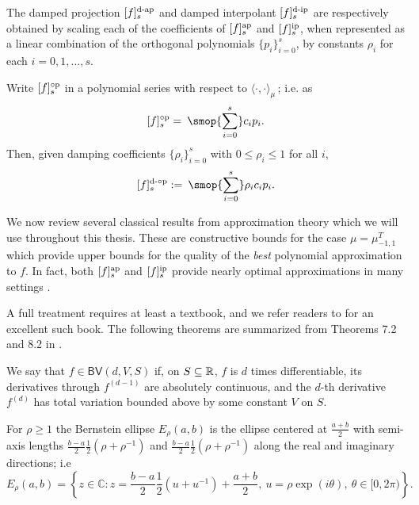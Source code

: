 The damped projection \( \ff[d-a]{f}{s} \) and damped interpolant \( \ff[d-i]{f}{s} \) are respectively obtained by scaling each of the coefficients of \( \ff[a]{f}{s} \) and \( \ff[i]{f}{s} \), when represented as a linear combination of the orthogonal polynomials \( \{ p_i \}_{i=0}^{s} \), by constants \( \rho_i \) for each \( i = 0,1,\ldots, s\).
\begin{definition}
\label{def:damping}
    Write \( \ff{f}{s} \) in a polynomial series with respect to \( \langle \cdot, \cdot \rangle_\mu \)\,; i.e. as
    \begin{equation*}
        \ff{f}{s} = \: \smop{\sum_{i=0}^{s}} c_i p_i.
    \end{equation*}
    Then, given damping coefficients \( \{ \rho_i \}_{i=0}^{s} \) with \( 0\leq \rho_i \leq 1 \) for all \( i \),
    \begin{equation*}
        \ff[d-$\circ$]{f}{s} := \: \smop{\sum_{i=0}^{s}} \rho_i c_i p_i.
    \end{equation*}
\end{definition}



We now review several classical results from approximation theory which we will use throughout this thesis.
These are constructive bounds for the case \( \mu = \mu_{-1,1}^T \) which provide upper bounds for the quality of the \emph{best} polynomial approximation to \( f \).
In fact, both  \( \ff[a]{f}{s} \) and \( \ff[i]{f}{s} \) provide nearly optimal approximations in many settings \cite{trefethen_19}.

A full treatment requires at least a textbook, and we refer readers to \cite{trefethen_19} for an excellent such book.
The following theorems are summarized from Theorems 7.2 and 8.2 in \cite{trefethen_19}.

\begin{definition}
    We say that \( f\in \mathsf{BV}(d,V,S) \) if, on \( S\subseteq \mathbb{R} \), \( f \) is \( d \) times differentiable, its derivatives through \( f^{(d-1)} \) are absolutely continuous, and the \( d \)-th derivative \( f^{(d)} \) has total variation bounded above by some constant \( V \) on \( S \).
\end{definition}


\begin{definition}
    For \( \rho \geq 1 \) the Bernstein ellipse \( E_\rho(a,b) \) is the ellipse centered at \( \frac{a+b}{2} \) with semi-axis lengths \( \frac{b-a}{2} \frac{1}{2} (\rho + \rho^{-1}) \) and \( \frac{b-a}{2}\frac{1}{2} (\rho+\rho^{-1}) \) along the real and imaginary directions; i.e
    \begin{equation*}
        E_\rho(a,b) = \left\{ z \in\mathbb{C} : z = \frac{b-a}{2} \frac{1}{2} (u + u^{-1}) + \frac{a+b}{2}, \: u = \rho \exp(i\theta), \: \theta\in[0,2\pi) \right\}. 
    \end{equation*}
\end{definition}


